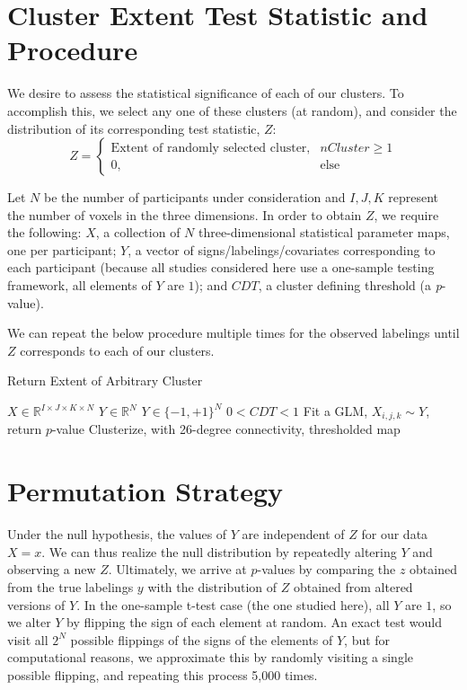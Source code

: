 \documentclass{article}
\begin{document}
\section{Cluster Extent Test Statistic and Procedure}
We desire to assess the statistical significance of each of our clusters.
To accomplish this, we select any one of these clusters (at random), and consider the distribution of its corresponding test statistic, $Z$:
\begin{equation}
  Z = 
  \begin{cases}
    \text{Extent of randomly selected cluster}, & nCluster\geq1\\
    0, & \text{else}
  \end{cases}
\end{equation}


Let $N$ be the number of participants under consideration and $I, J, K$ represent the number of voxels in the three dimensions. In order to obtain $Z$, we require the following: $X$, a collection of $N$ three-dimensional statistical parameter maps, one per participant; $Y$, a vector of signs/labelings/covariates corresponding to each participant (because all studies considered here use a one-sample testing framework, all elements of $Y$ are $1$); and $CDT$, a cluster defining threshold (a \textit{p}-value).

We can repeat the below procedure multiple times for the observed labelings until $Z$ corresponds to each of our clusters.

\begin{algorithm}[H]
  \caption{Return Extent of Arbitrary Cluster}
  \begin{algorithmic}[1]
    \REQUIRE $X \in \mathbb{R}^{I \times J \times K \times N}$
    \REQUIRE $Y \in \mathbb{R}^{N}$  $Y \in \{-1,+1\}^{N}$
    \REQUIRE $0 < CDT < 1$
    \STATE Fit a GLM, $X_{i,j,k} \sim Y$, return $p$-value
    \ELSE
    \ENDIF
    \ENDFOR
    \STATE Clusterize, with 26-degree connectivity, thresholded map
    \ELSE
    \ENDIF
  \end{algorithmic}
\end{algorithm}

\section{Permutation Strategy}
Under the null hypothesis, the values of $Y$ are independent of $Z$ for our data $X=x$. We can thus realize the null distribution by repeatedly altering $Y$ and observing a new $Z$. Ultimately, we arrive at $p$-values by comparing the $z$ obtained from the true labelings $y$ with the distribution of $Z$ obtained from altered versions of $Y$. In the one-sample t-test case (the one studied here), all $Y$ are $1$, so we alter $Y$ by flipping the sign of each element at random. An exact test would visit all $2^N$ possible flippings of the signs of the elements of $Y$, but for computational reasons, we approximate this by randomly visiting a single possible flipping, and repeating this process 5,000 times.
\end{document}
